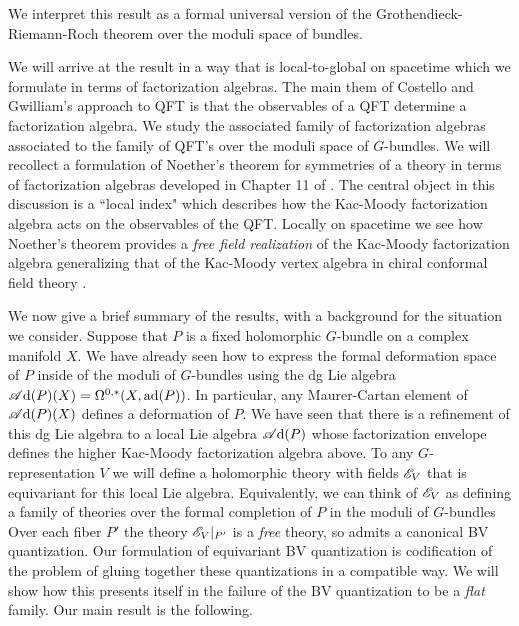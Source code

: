 \documentclass[10pt]{amsart}
\def\sAd{\sA{\rm d}}
\begin{document}
We interpret this result as a formal universal version of the Grothendieck-Riemann-Roch theorem over the moduli space of bundles. 

We will arrive at the result in a way that is local-to-global on spacetime which we formulate in terms of factorization algebras.
The main them of Costello and Gwilliam's approach to QFT is that the observables of a QFT determine a factorization algebra. 
We study the associated family of factorization algebras associated to the family of QFT's over the moduli space of $G$-bundles.
We will recollect a formulation of Noether's theorem for symmetries of a theory in terms of factorization algebras developed in Chapter 11 of \cite{CG2}. 
The central object in this discussion is a ``local index" which describes how the Kac-Moody factorization algebra acts on the observables of the QFT. 
Locally on spacetime we see how Noether's theorem provides a {\em free field realization} of the Kac-Moody factorization algebra generalizing that of the Kac-Moody vertex algebra in chiral conformal field theory \cite{FrenkelFree}. 

We now give a brief summary of the results, with a background for the situation we consider.
Suppose that $P$ is a fixed holomorphic $G$-bundle on a complex manifold $X$.
We have already seen how to express the formal deformation space of $P$ inside of the moduli of $G$-bundles using the dg Lie algebra $\sAd(P)(X) = \Omega^{0,*}(X , \ad (P))$.
In particular, any Maurer-Cartan element of $\sAd(P)(X)$ defines a deformation of $P$. 
We have seen that there is a refinement of this dg Lie algebra to a local Lie algebra $\sAd(P)$ whose factorization envelope defines the higher Kac-Moody factorization algebra above.
To any $G$-representation $V$ we will define a holomorphic theory with fields $\mathscr E_V$ that is equivariant for this local Lie algebra. 
Equivalently, we can think of $\mathscr E_V$ as defining a family of theories over the formal completion of $P$ in the moduli of $G$-bundles
\ben
{}
\een
Over each fiber $P'$ the theory $\mathscr E_V|_{P'}$ is a {\em free} theory, so admits a canonical BV quantization. 
Our formulation of equivariant BV quantization is codification of the problem of gluing together these quantizations in a compatible way.
We will show how this presents itself in the failure of the BV quantization to be a {\em flat} family. 
Our main result is the following. 
\end{document}
